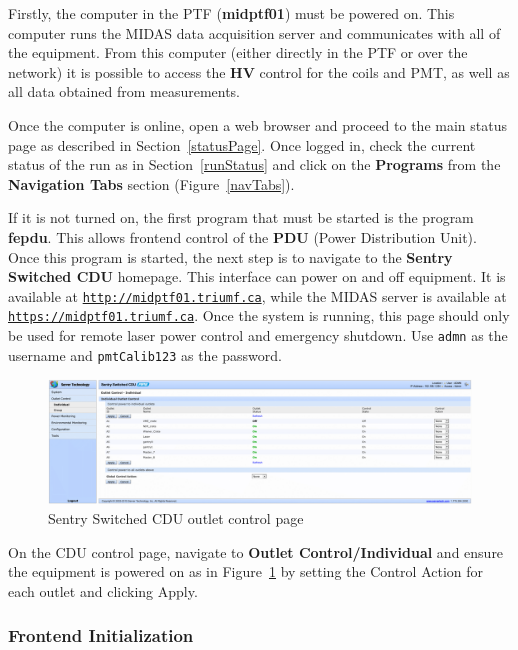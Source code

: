 \documentclass[twoside,letterpaper]{refart}
\begin{document}
Firstly, the computer in the PTF (\textbf{midptf01}) must be powered on. This computer runs the MIDAS data acquisition server and communicates with all of the equipment. From this computer (either directly in the PTF or over the network) it is possible to access the \textbf{HV} control for the coils and PMT, as well as all data obtained from measurements.

Once the computer is online, open a web browser and proceed to the main status page as described in Section~\ref{statusPage}. Once logged in, check the current status of the run as in Section~\ref{runStatus} and click on the \textbf{Programs} from the \textbf{Navigation Tabs} section (Figure~\ref{navTabs}).

If it is not turned on, the first program that must be started is the program \textbf{fepdu}. This allows frontend control of the \textbf{PDU} (Power Distribution Unit). Once this program is started, the next step is to navigate to the \textbf{Sentry Switched CDU} homepage. This interface can power on and off equipment. It is available at \href{http://midptf01.triumf.ca}{\texttt{http://midptf01.triumf.ca}}, while the MIDAS server is available at \href{https://midptf01.triumf.ca}{\texttt{https://midptf01.triumf.ca}}. Once the system is running, this page should only be used for remote laser power control and emergency shutdown. Use \texttt{admn} as the username and \texttt{pmtCalib123} as the password.

\begin{figure}[!htpb]\centering
	\includegraphics[width=\textwidth]{images/sentrySwitchedCDU.png}
	\caption{Sentry Switched CDU outlet control page\label{cdu}}
\end{figure}

On the CDU control page, navigate to \textbf{Outlet Control/Individual} and ensure the equipment is powered on as in Figure~\ref{cdu} by setting the Control Action for each outlet and clicking Apply.

\subsubsection{Frontend Initialization}
\end{document}
